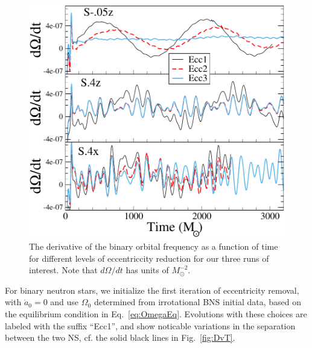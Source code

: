 {%
\begin{figure}
\includegraphics[width=0.95\columnwidth]{chap2/DOmegaVT}
\caption[The derivative of the binary orbital frequency at different levels of eccentricity reduction.]{{\label{fig:DOmegaVT}} The derivative of the binary orbital
  frequency as a function of time for different levels of
  eccentriccity reduction for our three runs of interest. Note that
  $d\Omega/dt$ has units of $M_{\odot}^{-2}$. }
\end{figure}


For binary neutron stars, we initialize the first iteration
of eccentricity removal, with $\dot{a}_0=0$ and use
$\Omega_0$ determined from irrotational BNS initial data, based on
the equilibrium condition in Eq.~\ref{eq:OmegaEq}.  Evolutions with
these choices are labeled with the suffix ``Ecc1'', and show noticable
variations in the separation between the two NS, cf. the solid black
lines in Fig.~\ref{fig:DvT}.

}
